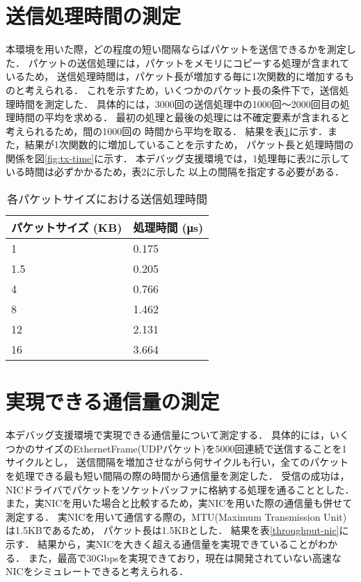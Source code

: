 \documentclass[12pt]{jsarticle}
\begin{document}
\section{送信処理時間の測定}

本環境を用いた際，どの程度の短い間隔ならばパケットを送信できるかを測定した．
パケットの送信処理には，パケットをメモリにコピーする処理が含まれているため，
送信処理時間は，パケット長が増加する毎に1次関数的に増加するものと考えられる．
これを示すため，いくつかのパケット長の条件下で，送信処理時間を測定した．
具体的には，3000回の送信処理中の1000回〜2000回目の処理時間の平均を求める．
最初の処理と最後の処理には不確定要素が含まれると考えられるため，間の1000回の
時間から平均を取る．
結果を表\ref{tx-time}に示す．また，結果が1次関数的に増加していることを示すため，
パケット長と処理時間の関係を図\ref{fig:tx-time}に示す．
本デバッグ支援環境では，1処理毎に表2に示している時間は必ずかかるため，表2に示した
以上の間隔を指定する必要がある．


\begin{table}[h]
    \caption{各パケットサイズにおける送信処理時間}
    \label{tx-time}
    \begin{center}
        \begin{tabular}{l|l}   \hline \hline 
            パケットサイズ (KB)      & 処理時間 (μs)    \\ \hline
            1                        & 0.175            \\
            1.5                      & 0.205            \\
            4                        & 0.766            \\
            8                        & 1.462            \\
            12                       & 2.131            \\
            16                       & 3.664            \\ \hline
        \end{tabular}
    \end{center}
\end{table}

\section{実現できる通信量の測定}

本デバッグ支援環境で実現できる通信量について測定する．
具体的には，いくつかのサイズのEthernetFrame(UDPパケット)を5000回連続で送信することを1サイクルとし，
送信間隔を増加させながら何サイクルも行い，全てのパケットを処理できる最も短い間隔の際の時間から通信量を測定した．
受信の成功は，NICドライバでパケットをソケットバッファに格納する処理を通ることとした．
また，実NICを用いた場合と比較するため，実NICを用いた際の通信量も併せて測定する．
実NICを用いて通信する際の，MTU(Maximum Transmission Unit)は1.5KBであるため，
パケット長は1.5KBとした．
結果を表\ref{throughput-nic}に示す．
結果から，実NICを大きく超える通信量を実現できていることがわかる．
また，最高で30Gbpsを実現できており，現在は開発されていない高速なNICをシミュレートできると考えられる．
\end{document}
